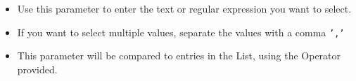 \begin{itemize}
\item Use this parameter to enter the text or regular expression  you want to select.
\item If you want to select multiple values, separate the values with a comma {\tt ','}
\item This parameter will be compared to entries in the List, using the Operator provided.
\end{itemize}

